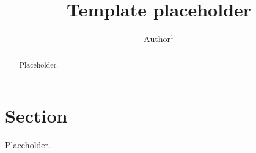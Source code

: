 \documentclass{iopjournal}
\begin{document}
\title{Template placeholder}
\author{Author$^1$}
\begin{abstract}
Placeholder.
\end{abstract}
\section{Section}
Placeholder.
\end{document}

